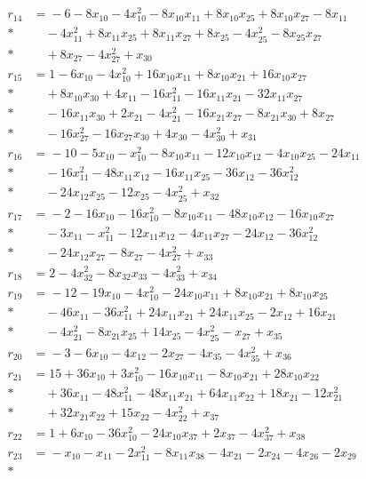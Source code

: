 \documentclass[11pt]{article}
\theoremstyle{remark}\newtheorem{remark}[theorem]{Remark}
\begin{document}
\begin{align*}
r_{14}&={}-6-8x_{10}-4x_{10}^{2}-8x_{10}x_{11}+8x_{10}x_{25}+8x_{10}x_{27}-8x_{11}\\*
&\quad{}-4x_{11}^{2}+8x_{11}x_{25}+8x_{11}x_{27}+8x_{25}-4x_{25}^{2}-8x_{25}x_{27}\\*
&\quad{}+8x_{27}-4x_{27}^{2}+x_{30}\\[2pt]
r_{15}&={}1-6x_{10}-4x_{10}^{2}+16x_{10}x_{11}+8x_{10}x_{21}+16x_{10}x_{27}\\*
&\quad{}+8x_{10}x_{30}+4x_{11}-16x_{11}^{2}-16x_{11}x_{21}-32x_{11}x_{27}\\*
&\quad{}-16x_{11}x_{30}+2x_{21}-4x_{21}^{2}-16x_{21}x_{27}-8x_{21}x_{30}+8x_{27}\\*
&\quad{}-16x_{27}^{2}-16x_{27}x_{30}+4x_{30}-4x_{30}^{2}+x_{31}\\[2pt]
r_{16}&={}-10-5x_{10}-x_{10}^{2}-8x_{10}x_{11}-12x_{10}x_{12}-4x_{10}x_{25}-24x_{11}\\*
&\quad{}-16x_{11}^{2}-48x_{11}x_{12}-16x_{11}x_{25}-36x_{12}-36x_{12}^{2}\\*
&\quad{}-24x_{12}x_{25}-12x_{25}-4x_{25}^{2}+x_{32}\\[2pt]
r_{17}&={}-2-16x_{10}-16x_{10}^{2}-8x_{10}x_{11}-48x_{10}x_{12}-16x_{10}x_{27}\\*
&\quad{}-3x_{11}-x_{11}^{2}-12x_{11}x_{12}-4x_{11}x_{27}-24x_{12}-36x_{12}^{2}\\*
&\quad{}-24x_{12}x_{27}-8x_{27}-4x_{27}^{2}+x_{33}\\[2pt]
r_{18}&={}2-4x_{32}^{2}-8x_{32}x_{33}-4x_{33}^{2}+x_{34}\\[2pt]
r_{19}&={}-12-19x_{10}-4x_{10}^{2}-24x_{10}x_{11}+8x_{10}x_{21}+8x_{10}x_{25}\\*
&\quad{}-46x_{11}-36x_{11}^{2}+24x_{11}x_{21}+24x_{11}x_{25}-2x_{12}+16x_{21}\\*
&\quad{}-4x_{21}^{2}-8x_{21}x_{25}+14x_{25}-4x_{25}^{2}-x_{27}+x_{35}\\[2pt]
r_{20}&={}-3-6x_{10}-4x_{12}-2x_{27}-4x_{35}-4x_{35}^{2}+x_{36}\\[2pt]
r_{21}&={}15+36x_{10}+3x_{10}^{2}-16x_{10}x_{11}-8x_{10}x_{21}+28x_{10}x_{22}\\*
&\quad{}+36x_{11}-48x_{11}^{2}-48x_{11}x_{21}+64x_{11}x_{22}+18x_{21}-12x_{21}^{2}\\*
&\quad{}+32x_{21}x_{22}+15x_{22}-4x_{22}^{2}+x_{37}\\[2pt]
r_{22}&={}1+6x_{10}-36x_{10}^{2}-24x_{10}x_{37}+2x_{37}-4x_{37}^{2}+x_{38}\\[2pt]
r_{23}&={}-x_{10}-x_{11}-2x_{11}^{2}-8x_{11}x_{38}-4x_{21}-2x_{24}-4x_{26}-2x_{29}\\*

\end{align*}
\end{document}
